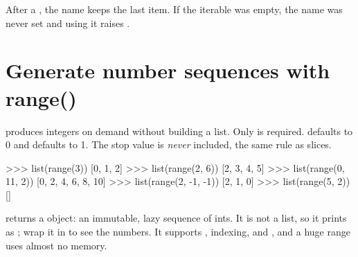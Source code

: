 \begin{trap}
After a , the name keeps the last item. If the iterable was empty, the name was never set and
using it raises .
\end{trap}

\section{Generate number sequences with range()}

 produces integers on demand without building a list. Only  is
required.  defaults to 0 and  defaults to 1. The stop value is \emph{never}
included, the same rule as slices.

%
\begin{center}
\end{center}

\begin{pycode}
>>> list(range(3))
[0, 1, 2]
>>> list(range(2, 6))
[2, 3, 4, 5]
>>> list(range(0, 11, 2))
[0, 2, 4, 6, 8, 10]
>>> list(range(2, -1, -1))
[2, 1, 0]
>>> list(range(5, 2))
[]
\end{pycode}

\begin{typecheck}
 returns a  object: an immutable, lazy sequence of ints. It is not a list, so
it prints as ; wrap it in  to see the numbers. It supports ,
indexing, and , and a huge range uses almost no memory.
\end{typecheck}

